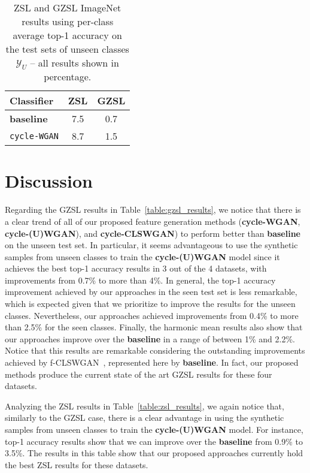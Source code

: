 \documentclass[runningheads]{llncs}
\begin{document}


\begin{table}
\centering
\caption{ZSL and GZSL ImageNet results using per-class average top-1 accuracy on the test sets of unseen classes $\mathcal{Y}_U$ -- all results shown in percentage.}
\label{table:zsl_imagenet}
\centering
\begin{tabular}{lcc}
\hline
\textbf{Classifier}  & \textbf{ZSL} & \textbf{GZSL}
\\ 
\hline
\textbf{baseline}~\cite{XianCVPR2018} & 7.5 & 0.7 \\
\texttt{cycle-WGAN}  & 8.7 & 1.5\\
\hline
\end{tabular}
\end{table}

%
%
%
%
%

\section{Discussion}
\label{sec:discussion}

Regarding the GZSL results in Table~\ref{table:gzsl_results}, we notice that there is a clear trend of all of our proposed feature generation methods (\textbf{cycle-WGAN}, \textbf{cycle-(U)WGAN}), and \textbf{cycle-CLSWGAN}) to perform better than \textbf{baseline} on the unseen test set.  In particular, it seems advantageous to use the synthetic samples from unseen classes to train the \textbf{cycle-(U)WGAN} model since it achieves the best top-1 accuracy results in 3 out of the 4 datasets, with improvements from 0.7\% to more than 4\%.  In general, the top-1 accuracy improvement achieved by our approaches in the seen test set is less remarkable, which is expected given that we prioritize to improve the results for the unseen classes.  Nevertheless, our approaches achieved improvements from 0.4\% to more than 2.5\% for the seen classes.  Finally, the harmonic mean results also show that our approaches improve over the \textbf{baseline} in a range of between 1\% and 2.2\%.  Notice that this results are remarkable considering the outstanding improvements achieved by f-CLSWGAN~\cite{XianCVPR2018}, represented here by \textbf{baseline}.  In fact, our proposed methods produce the current state of the art GZSL results for these four datasets.

Analyzing the ZSL results in Table~\ref{table:zsl_results}, we again notice that, similarly to the GZSL case, there is a clear advantage in using the synthetic samples from unseen classes to train the \textbf{cycle-(U)WGAN} model.  For instance, top-1 accuracy results show that we can improve over the \textbf{baseline} from 0.9\% to 3.5\%. The results  in this table show that our proposed approaches currently hold the best ZSL results for these datasets.
\end{document}
